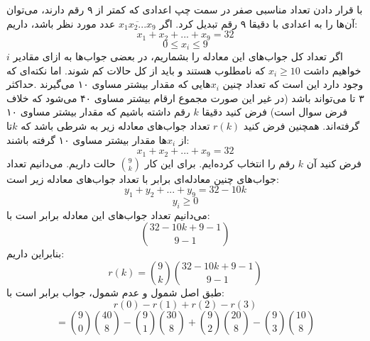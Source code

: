 \p
با قرار دادن تعداد مناسبی صفر در سمت چپ اعدادی که کمتر از ۹ رقم دارند، می‌توان آن‌ها را به اعدادی با دقیقا ۹ رقم تبدیل کرد. اگر 
$\overline{x_1x_2...x_9}$
عدد مورد نظر باشد، داریم: 
$$x_1 + x_2 + ... + x_9 = 32$$
$$0 \leq x_i \leq 9$$
\p
اگر تعداد کل جواب‌های این معادله را بشماریم، در بعضی جواب‌ها به ازای مقادیر $i$ خواهیم داشت $x_i \geq 10$ که نامطلوب هستند و باید از کل حالات کم شوند. اما نکته‌ای که وجود دارد این است که تعداد چنین $x_i$هایی که مقدار بیشتر مساوی ۱۰ می‌گیرند 
.حداکثر ۳ تا می‌تواند باشد (در غیر این صورت مجموع ارقام بیشتر مساوی ۴۰ می‌شود که خلاف فرض سوال است)
\p
فرض کنید دقیقا $k$ رقم داشته باشیم که مقدار بیشتر مساوی ۱۰ گرفته‌اند.
همچنین فرض کنید $r(k)$ تعداد جواب‌های معادله زیر به شرطی باشد که $k$تا از $x_i$ها مقدار بیشتر مساوی ۱۰ گرفته باشند:
$$x_1 + x_2 + ... + x_9 = 32$$
\p
فرض کنید آن $k$ رقم را انتخاب کرده‌ایم.
برای این کار $\binom{9}{k}$
حالت داریم.
می‌دانیم تعداد جواب‌های چنین معادله‌ای برابر با تعداد جواب‌های معادله زیر است:
$$y_1 + y_2 + ... + y_9 = 32 - 10k$$ 
$$y_i \geq 0$$
می‌دانیم تعداد جواب‌های این معادله برابر است با:
$$\binom{32 - 10k + 9 - 1}{9 - 1}$$
بنابراین داریم:
$$r(k) = \binom{9}{k}\binom{32 - 10k + 9 - 1}{9 - 1}$$
\p
طبق اصل شمول و عدم شمول، جواب برابر است با:
$$r(0) - r(1) + r(2) - r(3)$$
$$= \binom{9}{0}\binom{40}{8} - \binom{9}{1}\binom{30}{8} + \binom{9}{2}\binom{20}{8} - \binom{9}{3}\binom{10}{8}$$
